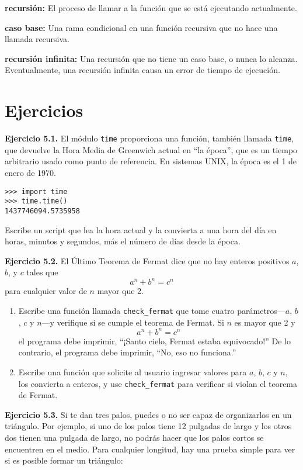 \textbf{recursión:} El proceso de llamar a la función que se está ejecutando actualmente.

\textbf{caso base:} Una rama condicional en una función recursiva que no hace una llamada recursiva.

\textbf{recursión infinita:} Una recursión que no tiene un caso base, o nunca lo alcanza. Eventualmente, una recursión infinita causa un error de tiempo de ejecución.

\section{Ejercicios}

\textbf{Ejercicio 5.1.} El módulo \texttt{time} proporciona una función, también llamada \texttt{time}, que devuelve la Hora Media de Greenwich actual en ``la época'', que es un tiempo arbitrario usado como punto de referencia. En sistemas UNIX, la época es el 1 de enero de 1970.

\begin{verbatim}
>>> import time
>>> time.time()
1437746094.5735958
\end{verbatim}

Escribe un script que lea la hora actual y la convierta a una hora del día en horas, minutos y segundos, más el número de días desde la época.

\textbf{Ejercicio 5.2.} El Último Teorema de Fermat dice que no hay enteros positivos $a$, $b$, y $c$ tales que
$$a^n + b^n = c^n$$
para cualquier valor de $n$ mayor que 2.

\begin{enumerate}
\item Escribe una función llamada \texttt{check\_fermat} que tome cuatro parámetros---$a$, $b$, $c$ y $n$---y verifique si se cumple el teorema de Fermat. Si $n$ es mayor que 2 y
$$a^n + b^n = c^n$$
el programa debe imprimir, ``¡Santo cielo, Fermat estaba equivocado!'' De lo contrario, el programa debe imprimir, ``No, eso no funciona.''

\item Escribe una función que solicite al usuario ingresar valores para $a$, $b$, $c$ y $n$, los convierta a enteros, y use \texttt{check\_fermat} para verificar si violan el teorema de Fermat.
\end{enumerate}

\textbf{Ejercicio 5.3.} Si te dan tres palos, puedes o no ser capaz de organizarlos en un triángulo. Por ejemplo, si uno de los palos tiene 12 pulgadas de largo y los otros dos tienen una pulgada de largo, no podrás hacer que los palos cortos se encuentren en el medio. Para cualquier longitud, hay una prueba simple para ver si es posible formar un triángulo:

